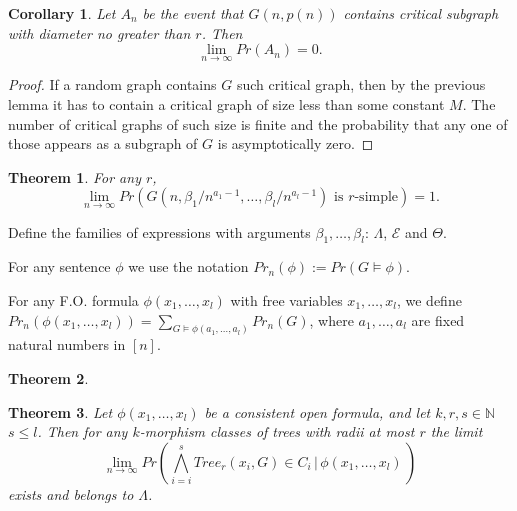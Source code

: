 \documentclass[11pt,notitlepage]{report}
\newtheorem{theorem}{Theorem}[chapter]
\newtheorem{corollary}{Corollary}[chapter]
\theoremstyle{definition}
\newcommand{\N}{\mathbb{N}}
\newcommand{\Ln}{\lim\limits_{n\to \infty}}
\begin{document}
\begin{corollary}
	Let $A_n$ be the event that $G(n,p(n))$ contains critical 
	subgraph with diameter no greater than $r$. Then
	\[ \Ln Pr(A_n)=0. \]
\end{corollary}
\begin{proof}
	If a random graph contains $G$ such critical graph, then by the previous
	lemma it has to contain a critical graph of size less than some constant $M$.
	The number of critical graphs of such size is finite and the probability 
	that any one of those appears as a subgraph of $G$ is asymptotically zero.	 
\end{proof}


\begin{theorem} For any $r$,
	\[\Ln Pr(G(n,\beta_1/n^{a_1-1}, \dots,\beta_l/n^{a_l-1} ) \text{ is }r \text{-simple})=1 .\]
\end{theorem}

	
	



Define the families of expressions with arguments $\beta_1,\dots, \beta_l$: 
$\Lambda$, $\mathcal{E}$ and $\Theta$. \par
For any sentence $\phi$ we use the notation 
$Pr_n(\phi):=Pr(G\models \phi)$. \par
For any F.O. formula $\phi(x_1,\dots,x_l)$ with free variables 
$x_1, \dots, x_l$, we define $Pr_n(\phi(x_1,\dots,x_l))=
\sum_{G\models \phi(a_1,\dots,a_l)} Pr_n(G) $, 
where $a_1, \dots, a_l$ are fixed natural numbers in $[n]$.


\begin{theorem}
	
\end{theorem}

\begin{theorem} 
	Let $\phi(x_1,\dots, x_l)$ be a consistent open formula, and let $k,r,s\in \N$ $s\leq l$. Then for any $k$-morphism classes of trees with radii
	at most $r$ the limit
	\[ \Ln Pr(\bigwedge_{i=i}^s Tree_r(x_i,G)\in C_i \, | \, \phi(x_1,\dots, x_l) \,)\]
	exists and belongs to $\Lambda$.	
\end{theorem}


 





\end{document}
